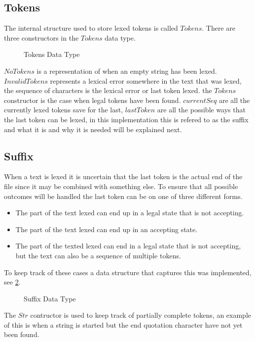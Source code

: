 \subsection{Tokens}
The internal structure used to store lexed tokens is called $Tokens$. There are
three constructors in the $Tokens$ data type.

\begin{figure}[h!]
  
  \caption{Tokens Data Type\label{fig:tokens}}
\end{figure}

$NoTokens$ is a representation of when an empty string has been lexed.
$InvalidTokens$ represents a lexical error somewhere in the text that was lexed,
the sequence of characters is the lexical error or last token lexed. the
$Tokens$ constructor is the case when legal tokens have been found. $currentSeq$
are all the currently lexed tokens save for the last, $lastToken$ are all the
possible ways that the last token can be lexed, in this implementation this is
refered to as the suffix and what it is and why it is needed will be explained
next.

\subsection{Suffix}\label{sub:suff}
When a text is lexed it is uncertain that the last token is the actual end of
the file since it may be combined with something else. To ensure that all
possible outcomes will be handled the last token can be on one of three different
forms.

\begin{itemize}
\item The part of the text lexed can end up in a legal state that is not
accepting.
\item The part of the text lexed can end up in an accepting state.
\item The part of the texted lexed can end in a legal state that is not
accepting, but the text can also be a sequence of multiple tokens.
\end{itemize}
To keep track of these cases a data structure that captures this was
implemented, see \cref{fig:suff}.

\begin{figure}[h!]
  
  \caption{Suffix Data Type\label{fig:suff}}
\end{figure}

The $Str$ contructor is used to keep track of partially complete tokens, an
example of this is when a string is started but the end quotation character have
not yet been found.


